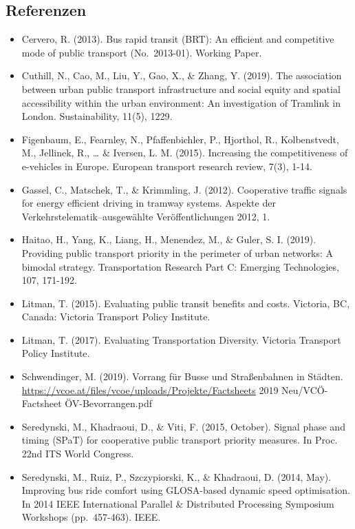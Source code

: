 \documentclass[
]{book}
\providecommand{\tightlist}{%
  \setlength{\itemsep}{0pt}\setlength{\parskip}{0pt}}
\begin{document}
\hypertarget{referenzen-5}{%
\subsection*{Referenzen}\label{referenzen-5}}

\begin{itemize}
\tightlist
\item
  Cervero, R. (2013). Bus rapid transit (BRT): An efficient and competitive mode of public transport (No.~2013-01). Working Paper.
\item
  Cuthill, N., Cao, M., Liu, Y., Gao, X., \& Zhang, Y. (2019). The association between urban public transport infrastructure and social equity and spatial accessibility within the urban environment: An investigation of Tramlink in London. Sustainability, 11(5), 1229.
\item
  Figenbaum, E., Fearnley, N., Pfaffenbichler, P., Hjorthol, R., Kolbenstvedt, M., Jellinek, R., \ldots{} \& Iversen, L. M. (2015). Increasing the competitiveness of e-vehicles in Europe. European transport research review, 7(3), 1-14.
\item
  Gassel, C., Matschek, T., \& Krimmling, J. (2012). Cooperative traffic signals for energy efficient driving in tramway systems. Aspekte der Verkehrstelematik--ausgewählte Veröffentlichungen 2012, 1.
\item
  Haitao, H., Yang, K., Liang, H., Menendez, M., \& Guler, S. I. (2019). Providing public transport priority in the perimeter of urban networks: A bimodal strategy. Transportation Research Part C: Emerging Technologies, 107, 171-192.
\item
  Litman, T. (2015). Evaluating public transit benefits and costs. Victoria, BC, Canada: Victoria Transport Policy Institute.
\item
  Litman, T. (2017). Evaluating Transportation Diversity. Victoria Transport Policy Institute.
\item
  Schwendinger, M. (2019). Vorrang für Busse und Straßenbahnen in Städten. \url{https://vcoe.at/files/vcoe/uploads/Projekte/Factsheets} 2019 Neu/VCÖ-Factsheet ÖV-Bevorrangen.pdf
\item
  Seredynski, M., Khadraoui, D., \& Viti, F. (2015, October). Signal phase and timing (SPaT) for cooperative public transport priority measures. In Proc. 22nd ITS World Congress.
\item
  Seredynski, M., Ruiz, P., Szczypiorski, K., \& Khadraoui, D. (2014, May). Improving bus ride comfort using GLOSA-based dynamic speed optimisation. In 2014 IEEE International Parallel \& Distributed Processing Symposium Workshops (pp.~457-463). IEEE.

\end{itemize}
\end{document}
